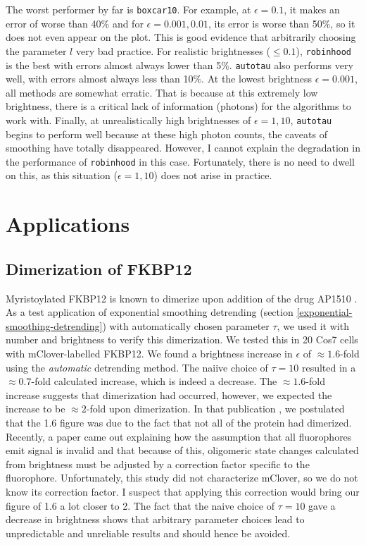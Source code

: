 \documentclass[12pt,]{book}
\theoremstyle{definition}
\theoremstyle{definition}
\theoremstyle{definition}
\theoremstyle{remark}
\begin{document}
The worst performer by far is \texttt{boxcar10}. For example, at
\(\epsilon = 0.1\), it makes an error of worse than 40\% and for
\(\epsilon = 0.001, 0.01\), its error is worse than 50\%, so it does not
even appear on the plot. This is good evidence that arbitrarily choosing
the parameter \(l\) very bad practice. For realistic brightnesses
(\(\le 0.1\)), \texttt{robinhood} is the best with errors almost always
lower than 5\%. \texttt{autotau} also performs very well, with errors
almost always less than 10\%. At the lowest brightness
\(\epsilon = 0.001\), all methods are somewhat erratic. That is because
at this extremely low brightness, there is a critical lack of
information (photons) for the algorithms to work with. Finally, at
unrealistically high brightnesses of \(\epsilon = 1, 10\),
\texttt{autotau} begins to perform well because at these high photon
counts, the caveats of smoothing have totally disappeared. However, I
cannot explain the degradation in the performance of \texttt{robinhood}
in this case. Fortunately, there is no need to dwell on this, as this
situation (\(\epsilon = 1, 10\)) does not arise in practice.

\chapter{Applications}\label{applications}

\section{Dimerization of FKBP12}\label{dimerization-of-fkbp12}

Myristoylated FKBP12 is known to dimerize upon addition of the drug
AP1510 \citep{Amara}. As a test application of exponential smoothing
detrending (section \ref{exponential-smoothing-detrending}) with
automatically chosen parameter \(\tau\), we used it with number and
brightness to verify this dimerization. We tested this in 20 Cos7 cells
with mClover-labelled FKBP12. We found a brightness increase in
\(\epsilon\) of \(\approx 1.6\)-fold using the \emph{automatic}
detrending method. The naiive choice of \(\tau=10\) resulted in a
\(\approx 0.7\)-fold calculated increase, which is indeed a decrease.
The \(\approx 1.6\)-fold increase suggests that dimerization had
occurred, however, we expected the increase to be \(\approx 2\)-fold
upon dimerization. In that publication \citep{nandb}, we postulated that
the 1.6 figure was due to the fact that not all of the protein had
dimerized. Recently, a paper came out \citep{fpcompare} explaining how
the assumption that all fluorophores emit signal is invalid and that
because of this, oligomeric state changes calculated from brightness
must be adjusted by a correction factor specific to the fluorophore.
Unfortunately, this study did not characterize mClover, so we do not
know its correction factor. I suspect that applying this correction
would bring our figure of 1.6 a lot closer to 2. The fact that the naive
choice of \(\tau=10\) gave a decrease in brightness shows that arbitrary
parameter choices lead to unpredictable and unreliable results and
should hence be avoided.
\end{document}
